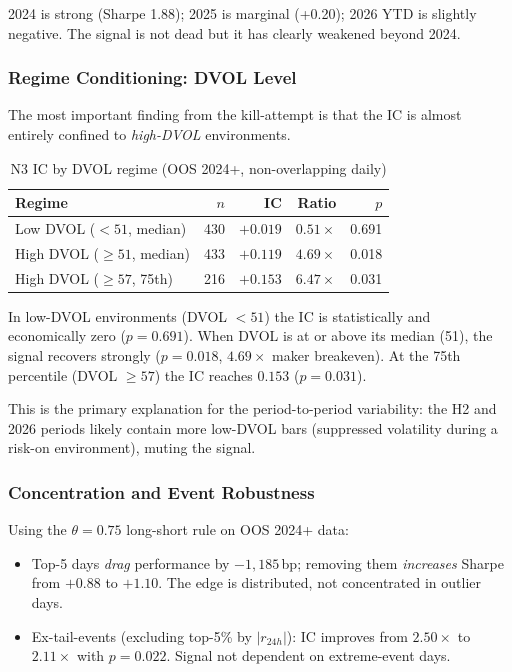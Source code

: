 \documentclass[12pt, a4paper]{article}
\theoremstyle{definition}
\begin{document}
2024 is strong (Sharpe 1.88); 2025 is marginal (+0.20); 2026 YTD is slightly
negative.  The signal is not dead but it has clearly weakened beyond 2024.

\subsubsection{Regime Conditioning: DVOL Level}

The most important finding from the kill-attempt is that the IC is almost
entirely confined to \emph{high-DVOL} environments.

\begin{table}[ht]
\centering
\caption{N3 IC by DVOL regime (OOS 2024+, non-overlapping daily)}
\label{tab:n3_regime}
\begin{tabular}{lrrrr}
\toprule
Regime & $n$ & IC & Ratio & $p$ \\
\midrule
Low DVOL ($< 51$, median)      & 430 & $+0.019$ & $0.51\times$ & 0.691 \\
High DVOL ($\geq 51$, median)  & 433 & $+0.119$ & $4.69\times$ & 0.018 \\
High DVOL ($\geq 57$, 75th)    & 216 & $+0.153$ & $6.47\times$ & 0.031 \\
\bottomrule
\end{tabular}
\end{table}

In low-DVOL environments (DVOL $< 51$) the IC is statistically and economically
zero ($p = 0.691$).  When DVOL is at or above its median (51), the signal
recovers strongly ($p = 0.018$, $4.69\times$ maker breakeven).  At the 75th
percentile (DVOL $\geq 57$) the IC reaches $0.153$ ($p = 0.031$).

This is the primary explanation for the period-to-period variability: the H2
and 2026 periods likely contain more low-DVOL bars (suppressed volatility
during a risk-on environment), muting the signal.

\subsubsection{Concentration and Event Robustness}

Using the $\theta = 0.75$ long-short rule on OOS 2024+ data:
\begin{itemize}[noitemsep]
  \item Top-5 days \emph{drag} performance by $-1{,}185$\,bp; removing them
        \emph{increases} Sharpe from $+0.88$ to $+1.10$.  The edge is
        distributed, not concentrated in outlier days.
  \item Ex-tail-events (excluding top-5\% by $|r_{24h}|$): IC improves from
        $2.50\times$ to $2.11\times$ with $p = 0.022$.  Signal not dependent
        on extreme-event days.
\end{itemize}
\end{document}
